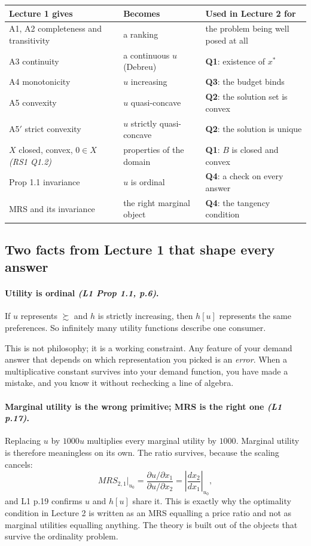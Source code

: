 \documentclass[11pt]{article}
\theoremstyle{definition}
\newcommand{\pref}{\succsim}
\newcommand{\xs}{x^*}
\newcommand{\src}[1]{\textit{\small (#1)}}
\begin{document}
\begin{center}
\begin{tabular}{@{}p{4.2cm}p{4.1cm}p{6.0cm}@{}}
\toprule
\textbf{Lecture 1 gives} & \textbf{Becomes} & \textbf{Used in Lecture 2 for} \\
\midrule
A1, A2 completeness and transitivity & a ranking & the problem being well posed at all \\[3pt]
A3 continuity & a continuous $u$ (Debreu) & \textbf{Q1}: existence of $\xs$ \\[3pt]
A4 monotonicity & $u$ increasing & \textbf{Q3}: the budget binds \\[3pt]
A5 convexity & $u$ quasi-concave & \textbf{Q2}: the solution set is convex \\[3pt]
A5$'$ strict convexity & $u$ strictly quasi-concave & \textbf{Q2}: the solution is unique \\[3pt]
$X$ closed, convex, $0\in X$ \src{RS1 Q1.2} & properties of the domain & \textbf{Q1}: $B$ is closed and convex \\[3pt]
Prop 1.1 invariance & $u$ is ordinal & \textbf{Q4}: a check on every answer \\[3pt]
MRS and its invariance & the right marginal object & \textbf{Q4}: the tangency condition \\
\bottomrule
\end{tabular}
\end{center}

\subsection{Two facts from Lecture 1 that shape every answer}

\paragraph{Utility is ordinal \src{L1 Prop 1.1, p.6}.} If $u$ represents $\pref$ and $h$ is
strictly increasing, then $h[u]$ represents the same preferences. So infinitely many utility
functions describe one consumer.

This is not philosophy; it is a working constraint. Any feature of your demand answer that
depends on which representation you picked is an \emph{error}. When a multiplicative
constant survives into your demand function, you have made a mistake, and you know it
without rechecking a line of algebra.

\paragraph{Marginal utility is the wrong primitive; MRS is the right one \src{L1 p.17}.}
Replacing $u$ by $1000u$ multiplies every marginal utility by $1000$. Marginal utility is
therefore meaningless on its own. The ratio survives, because the scaling cancels:
\[
MRS_{2,1}\Big|_{u_0}=\frac{\partial u/\partial x_1}{\partial u/\partial x_2}
=\left|\frac{dx_2}{dx_1}\right|_{u_0},
\]
and L1 p.19 confirms $u$ and $h[u]$ share it. This is exactly why the optimality condition
in Lecture 2 is written as an MRS equalling a price ratio and not as marginal utilities
equalling anything. The theory is built out of the objects that survive the ordinality
problem.
\end{document}
